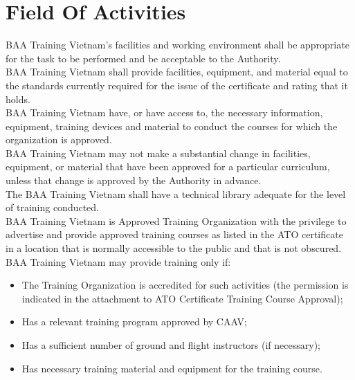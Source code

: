 \section{Field Of Activities}
    BAA Training Vietnam's facilities and working environment shall be appropriate for the task to be performed and be acceptable to the Authority. \\
    \vspace{3mm}
    BAA Training Vietnam shall provide facilities, equipment, and material equal to the standards currently required for the issue of the certificate 
    and rating that it holds. \\
    \vspace{3mm}
    BAA Training Vietnam have, or have access to, the necessary information, equipment, training devices and material to conduct the courses for which 
    the organization is approved. \\
    \vspace{3mm}
    BAA Training Vietnam may not make a substantial change in facilities, equipment, or material that have been approved for a particular curriculum, 
    unless that change is approved by the Authority in advance. \\
    \vspace{3mm}
    The BAA Training Vietnam shall have a technical library adequate for the level of training conducted. \\ 
    \vspace{3mm}
    BAA Training Vietnam is Approved Training Organization with the privilege to advertise and provide approved training courses as listed in the ATO 
    certificate in a location that is normally accessible to the public and that is not obscured. \\
    \vspace{3mm}
    BAA Training Vietnam may provide training only if: 
    \begin{itemize}
        \item The Training Organization is accredited for such activities (the permission is indicated in the attachment to ATO Certificate Training Course 
        Approval);
        \item Has a relevant training program approved by CAAV;
        \item Has a sufficient number of ground and flight instructors (if necessary);
        \item Has necessary training material and equipment for the training course.
    \end{itemize}

